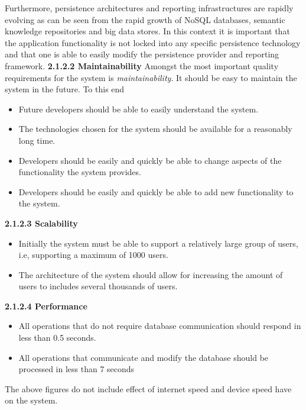 \documentclass[11pt]{article}
\begin{document}
	
	Furthermore, persistence architectures and reporting infrastructures are rapidly evolving as can
	be seen from the rapid growth of NoSQL databases, semantic knowledge repositories and big data
	stores. In this context it is important that the application functionality is not locked into any
	specific persistence technology and that one is able to easily modify the persistence provider and
	reporting framework.
	\newline
	\newline
	\textbf{2.1.2.2 Maintainability}
	\newline
	\newline
	Amongst the most important quality requirements for the system is
	\textit{maintainability}. It should be easy to maintain the system in the future. To this end
	\begin{itemize}
		\item Future developers should be able to easily understand the system.
		\item The technologies chosen for the system should be available for a reasonably long time.
		\item Developers should be easily and quickly be able to change aspects of the functionality the system provides.
		\item Developers should be easily and quickly be able to add new functionality to the system.
	\end{itemize}
	\newline
	\newline
	\textbf{2.1.2.3 Scalability}
	\begin{itemize}
		\item Initially the system must be able to support a relatively large group of users, i.e, supporting a maximum of 1000 users.
		\item The architecture of the system should allow for increasing the amount of users to includes several thousands of users.
	\end{itemize}
	\textbf{2.1.2.4 Performance}
	\begin{itemize}
		\item All operations that do not require database communication should respond in less than 0.5 seconds.
		\item All operations that communicate and modify the database should be processed in less than 7 seconds
	\end{itemize}
	The above figures do not include effect of internet speed and device speed have on the system.
	\newline
\end{document}
